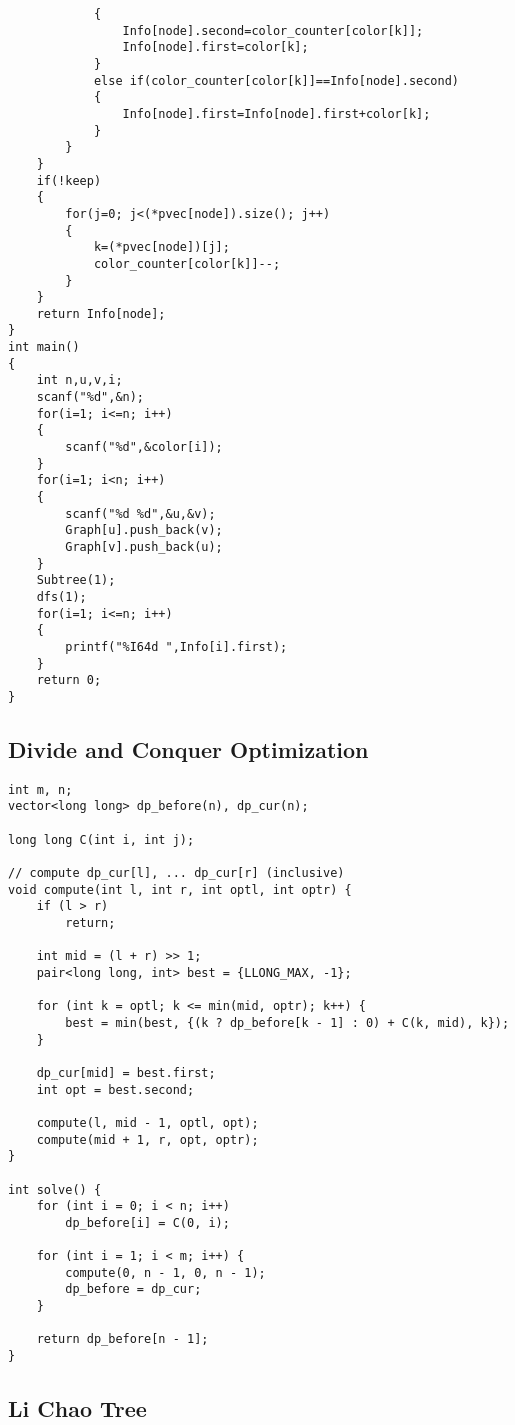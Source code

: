 \documentclass{article}
\begin{document}
\begin{multicols}{3}[]
\begin{verbatim}
            {
                Info[node].second=color_counter[color[k]];
                Info[node].first=color[k];
            }
            else if(color_counter[color[k]]==Info[node].second)
            {
                Info[node].first=Info[node].first+color[k];
            }
        }
    }
    if(!keep)
    {
        for(j=0; j<(*pvec[node]).size(); j++)
        {
            k=(*pvec[node])[j];
            color_counter[color[k]]--;
        }
    }
    return Info[node];
}
int main()
{
    int n,u,v,i;
    scanf("%d",&n);
    for(i=1; i<=n; i++)
    {
        scanf("%d",&color[i]);
    }
    for(i=1; i<n; i++)
    {
        scanf("%d %d",&u,&v);
        Graph[u].push_back(v);
        Graph[v].push_back(u);
    }
    Subtree(1);
    dfs(1);
    for(i=1; i<=n; i++)
    {
        printf("%I64d ",Info[i].first);
    }
    return 0;
}

\end{verbatim}


\subsection{Divide and Conquer Optimization}

\begin{verbatim}
int m, n;
vector<long long> dp_before(n), dp_cur(n);

long long C(int i, int j);

// compute dp_cur[l], ... dp_cur[r] (inclusive)
void compute(int l, int r, int optl, int optr) {
    if (l > r)
        return;

    int mid = (l + r) >> 1;
    pair<long long, int> best = {LLONG_MAX, -1};

    for (int k = optl; k <= min(mid, optr); k++) {
        best = min(best, {(k ? dp_before[k - 1] : 0) + C(k, mid), k});
    }

    dp_cur[mid] = best.first;
    int opt = best.second;

    compute(l, mid - 1, optl, opt);
    compute(mid + 1, r, opt, optr);
}

int solve() {
    for (int i = 0; i < n; i++)
        dp_before[i] = C(0, i);

    for (int i = 1; i < m; i++) {
        compute(0, n - 1, 0, n - 1);
        dp_before = dp_cur;
    }

    return dp_before[n - 1];
}

\end{verbatim}


\subsection{Li Chao Tree}


\end{multicols}
\end{document}
